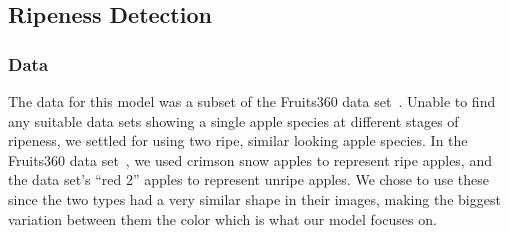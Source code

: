\subsection{Ripeness Detection}
\subsubsection{Data}
The data for this model was a subset of the Fruits360 data set~\cite{Fruit360}.
Unable to find any suitable data sets showing a single apple species at different stages of ripeness, we settled for using two ripe, similar looking apple species.
In the Fruits360 data set~\cite{Fruit360}, we used crimson snow apples to represent ripe apples, and the data set's ``red 2'' apples to represent unripe apples. We  chose to use these since the two types had a very similar shape in their images, making the biggest variation between them the color which is what our model focuses on.

